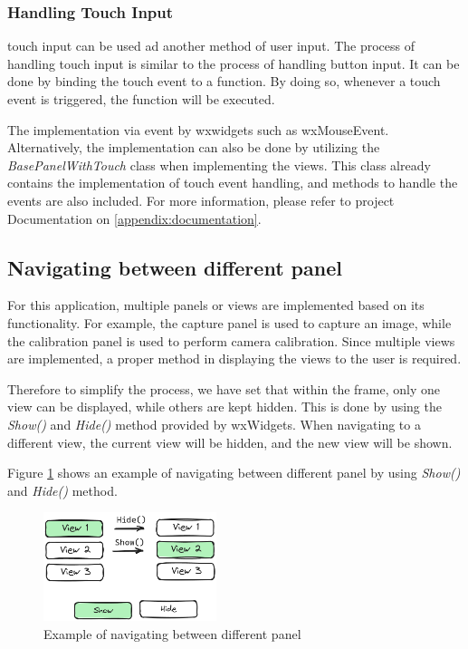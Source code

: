 \subsubsection{Handling Touch Input}
\label{subsubsec:handling_touch_input}
touch input can be  used ad another method of user input. The process of handling touch input is similar to the process of handling button input. It can be done by binding the touch event to a function. By doing so, whenever a touch event is triggered, the function will be executed.

The implementation via event by wxwidgets such as wxMouseEvent. Alternatively, the implementation can also be done by utilizing the \textit{BasePanelWithTouch} class when implementing the views. This class already contains the implementation of touch event handling, and  methods to handle the events are also included. For more information, please refer to project Documentation on \ref{appendix:documentation}.

\subsection{Navigating between different panel}
\label{subsec:navigating_between_different_panel}

For this application, multiple panels or views are implemented based on its functionality. For example, the capture panel is used to capture an image, while the calibration panel is used to perform camera calibration. Since multiple views are implemented, a proper method in displaying the views to the user is required.

Therefore to simplify the process, we have set that within the frame, only one view can be displayed, while others are kept hidden. This is done by using the \textit{Show()} and \textit{Hide()} method provided by wxWidgets. When navigating to a different view, the current view will be hidden, and the new view will be shown.

Figure \ref{fig:show_panel} shows an example of navigating between different panel by using \textit{Show()} and \textit{Hide()} method.

\begin{figure}[!ht]
    \centering
    \includegraphics[width=0.45\textwidth]{texs/Part2/chapter4/image/showpanel.png}
    \caption{Example of navigating between different panel}
    \label{fig:show_panel}
\end{figure}


